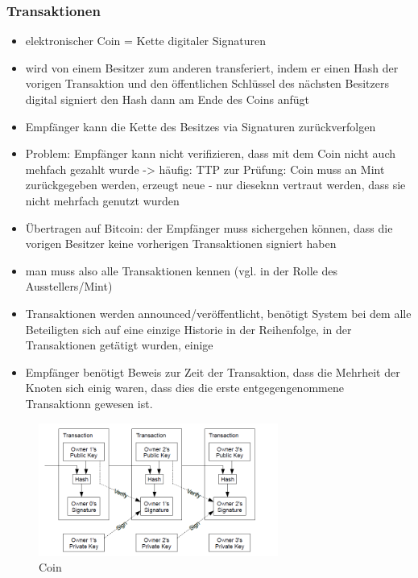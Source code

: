 \subsubsection*{Transaktionen}
    \begin{itemize}
        \item elektronischer Coin = Kette digitaler Signaturen
        \item wird von einem Besitzer zum anderen transferiert, indem er einen Hash der vorigen Transaktion und den öffentlichen Schlüssel des nächsten Besitzers digital signiert den Hash dann am Ende des Coins anfügt
        \item Empfänger kann die Kette des Besitzes via Signaturen zurückverfolgen
        \item Problem: Empfänger kann nicht verifizieren, dass mit dem Coin nicht auch mehfach gezahlt wurde -> häufig: TTP zur Prüfung: Coin muss an Mint zurückgegeben werden, erzeugt neue - nur dieseknn vertraut werden, dass sie nicht mehrfach genutzt wurden
        \item Übertragen auf Bitcoin: der Empfänger muss sichergehen können, dass die vorigen Besitzer keine vorherigen Transaktionen signiert haben
        \item man muss also alle Transaktionen kennen (vgl. in der Rolle des Ausstellers/Mint)
        \item Transaktionen werden announced/veröffentlicht, benötigt System bei dem alle Beteiligten sich auf eine einzige Historie in der Reihenfolge, in der Transaktionen getätigt wurden, einige
        \item Empfänger benötigt Beweis zur Zeit der Transaktion, dass die Mehrheit der Knoten sich einig waren, dass dies die erste entgegengenommene Transaktionn gewesen ist.
    \end{itemize}
    \begin{figure}[H]
        \centering
        \includegraphics[width=0.7\textwidth]{paperNotes/bitcoin01.PNG}
        \caption{Coin}
        \label{figure:coin}
    \end{figure}

